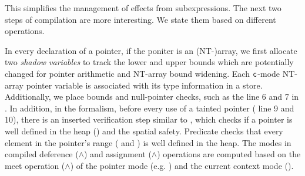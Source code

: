 This simplifies the management of effects from subexpressions. The
next two steps of compilation are more interesting.
We state them based on different \lang operations.


%
In every declaration  of a pointer,
if the poniter is an (NT-)array,
we first allocate two \emph{shadow variables}
to track the lower and upper bounds which are potentially changed for pointer arithmetic and NT-array bound widening.
Each $\texttt{c}$-mode NT-array pointer variable is associated with its type information in a store.
Additionally, we place bounds and null-pointer checks, such as the line 6 and 7 in .
In addition, in the formalism, before every use of a tainted pointer ( line 9 and 10), 
there is an inserted verification step similar to ,
which checks if a pointer is well defined in the heap () and the spatial safety.
Predicate  checks that every element in the pointer's range ( and ) is well defined in the heap.  
The modes in compiled deference ($\wedge$)
 and assignment ($\wedge$) operations 
are computed based on the meet 
operation ($\wedge$) of the pointer mode (e.g. ) and the current context mode ().

